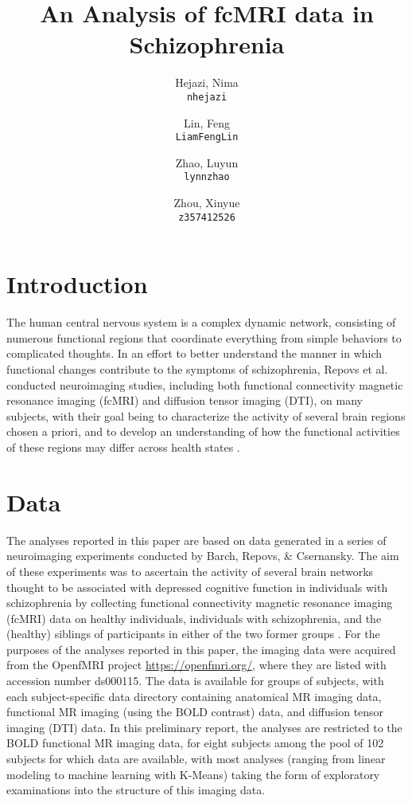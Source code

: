 \documentclass[11pt]{article}
\title{An Analysis of fcMRI data in Schizophrenia}
\author{
  Hejazi, Nima\\
  \texttt{nhejazi}
  \and
  Lin, Feng\\
  \texttt{LiamFengLin}
  \and
  Zhao, Luyun\\
  \texttt{lynnzhao}
  \and
  Zhou, Xinyue\\
  \texttt{z357412526}
}
\begin{document}
\maketitle


\section{Introduction}

The human central nervous system is a complex dynamic network, consisting of
numerous functional regions that coordinate everything from simple behaviors to
complicated thoughts. In an effort to better understand the manner in which
functional changes contribute to the symptoms of schizophrenia, Repovs et
al. conducted neuroimaging studies, including both functional connectivity
magnetic resonance imaging (fcMRI) and diffusion tensor imaging (DTI), on many
subjects, with their goal being to characterize the activity of several brain
regions chosen a priori, and to develop an understanding of how the functional 
activities of these regions may differ across health states \cite{repovs2011,repovs2012}.

\section{Data}

The analyses reported in this paper are based on data generated in a series of
neuroimaging experiments conducted by Barch, Repovs, \& Csernansky. The aim of
these experiments was to ascertain the activity of several brain networks
thought to be associated with depressed cognitive function in individuals with
schizophrenia by collecting functional connectivity magnetic resonance imaging
(fcMRI) data on healthy individuals, individuals with schizophrenia, and the
(healthy) siblings of participants in either of the two former groups
\cite{repovs2012}. For the purposes of the analyses reported in this paper, the imaging
data were acquired from the OpenfMRI project \url{https://openfmri.org/}, where they
are listed with accession number ds000115. The data is available for groups of
subjects, with each subject-specific data directory containing anatomical MR
imaging data, functional MR imaging (using the BOLD contrast) data, and
diffusion tensor imaging (DTI) data. In this preliminary report, the analyses
are restricted to the BOLD functional MR imaging data, for eight subjects among
the pool of 102 subjects for which data are available, with most analyses
(ranging from linear modeling to machine learning with K-Means) taking the form
of exploratory examinations into the structure of this imaging data.
\end{document}
